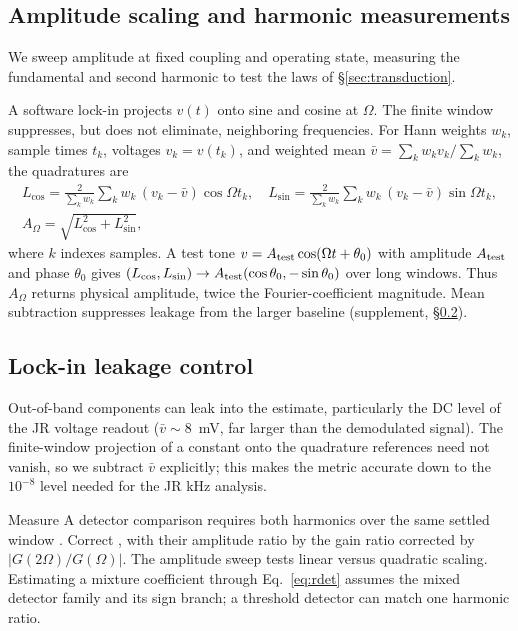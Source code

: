 \documentclass[11pt,a4paper]{article}
\newif\ifjne
\providecommand{\DIFaddtex}[1]{{\protect\color{blue} \sf #1}} %
\providecommand{\DIFdeltex}[1]{{\protect\color{red} \scriptsize #1}} %
\providecommand{\DIFaddbegin}{} %
\providecommand{\DIFaddend}{} %
\providecommand{\DIFdelbegin}{} %
\providecommand{\DIFdelend}{} %
\providecommand{\DIFadd}[1]{\texorpdfstring{\DIFaddtex{#1}}{#1}} %
\providecommand{\DIFdel}[1]{\texorpdfstring{\DIFdeltex{#1}}{}} %
\begin{document}
\subsection{Amplitude scaling and harmonic measurements}\label{sec:transduction-methods}
We sweep amplitude at fixed coupling and operating state, measuring the
fundamental and second harmonic to test the laws of \S\ref{sec:transduction}.

A software lock-in projects $v(t)$ onto sine and cosine at $\Omega$.
The finite window suppresses, but does not eliminate, neighboring frequencies.
For Hann weights $w_k$, sample times $t_k$, voltages $v_k=v(t_k)$, and
weighted mean $\bar v=\sum_k w_kv_k/\sum_k w_k$, the quadratures are
\begin{equation}
\begin{gathered}
L_{\cos}=\frac{2}{\sum_k w_k}\sum_k w_k\,(v_k-\bar v)\cos\Omega t_k,\quad
L_{\sin}=\frac{2}{\sum_k w_k}\sum_k w_k\,(v_k-\bar v)\sin\Omega t_k,\\
A_\Omega=\sqrt{L_{\cos}^2+L_{\sin}^2},
\end{gathered}
\label{eq:lockin}
\end{equation}
where $k$ indexes samples. A test tone
$v=A_{\rm test}\cos(\Omega t+\theta_0)$ with amplitude $A_{\rm test}$
and phase $\theta_0$ gives
$(L_{\cos},L_{\sin})\to A_{\rm test}(\cos\theta_0,-\sin\theta_0)$
over long windows. Thus $A_\Omega$ returns physical amplitude, twice the
Fourier-coefficient magnitude. Mean subtraction suppresses leakage from
the larger baseline (supplement, \S\ref{supp:lockin}).

\ifjne\else
\subsection{Lock-in leakage control}\label{supp:lockin}
Out-of-band components can leak into the estimate, particularly the DC level of the JR voltage readout ($\bar v\!\sim\!8$~mV, far
larger than the demodulated signal). The finite-window projection of a constant onto the quadrature references
need not vanish, so we subtract $\bar v$ explicitly; this makes the metric
accurate down to the $10^{-8}$ level needed for the JR kHz
analysis.

\fi

\DIFdelbegin \DIFdel{Measure }\DIFdelend \DIFaddbegin \DIFadd{A detector comparison requires }\DIFaddend both harmonics over the same settled window\DIFdelbegin \DIFdel{. Correct }\DIFdelend \DIFaddbegin \DIFadd{,
with }\DIFaddend their amplitude ratio \DIFdelbegin \DIFdel{by the gain ratio }\DIFdelend \DIFaddbegin \DIFadd{corrected by }\DIFaddend $|G(2\Omega)/G(\Omega)|$. The amplitude sweep tests
linear versus quadratic scaling. Estimating a mixture coefficient through
Eq.~\eqref{eq:rdet} assumes the mixed detector family and its
sign branch; a threshold detector can match one harmonic ratio.
\end{document}
